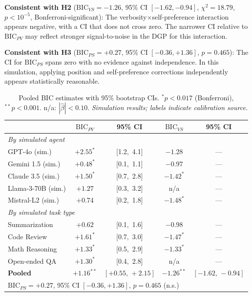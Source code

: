 \documentclass[10pt,conference]{IEEEtran}
\newcommand{\BIC}{\mathrm{BIC}}
\begin{document}
\textbf{Consistent with H2}
($\BIC_{VS}{=}{-}1.26$, 95\% CI $[-1.62,-0.94]$,
$\chi^2{=}18.79$, $p{<}10^{-5}$, Bonferroni-significant):
The verbosity$\times$self-preference interaction appears
negative, with a CI that does not cross zero.
The narrower CI relative to $\BIC_{PV}$ may reflect
stronger signal-to-noise in the DGP for this interaction.

\textbf{Consistent with H3}
($\BIC_{PS}{=}{+}0.27$, 95\% CI $[-0.36,{+}1.36]$,
$p{=}0.465$):
The CI for $\BIC_{PS}$ spans zero with no evidence
against independence.
In this simulation, applying position and self-preference
corrections independently appears statistically reasonable.

\begin{table}[htbp]
\centering
\caption{Pooled BIC estimates with 95\% bootstrap CIs.
${}^*p{<}0.017$ (Bonferroni), ${}^{**}p{<}0.001$.
n/a: $|\hat\beta|{<}0.10$.
\textit{Simulation results; labels indicate calibration source.}}
\label{tab:bic_main}
\small
\setlength{\tabcolsep}{3pt}
\begin{tabular}{lcccc}
\toprule
 & $\BIC_{PV}$ & 95\% CI & $\BIC_{VS}$ & 95\% CI \\
\midrule
\multicolumn{5}{l}{\textit{By simulated agent}} \\
GPT-4o (sim.)      & $+2.55^*$ & [1.2,~4.1] & $-1.28$    & --- \\
Gemini 1.5 (sim.)  & $+0.48^*$ & [0.1,~1.1] & $-0.97$    & --- \\
Claude 3.5 (sim.)  & $+1.50^*$ & [0.7,~2.8] & $-1.42^*$  & --- \\
Llama-3-70B (sim.) & $+1.27$   & [0.3,~3.2] & n/a        & --- \\
Mistral-L2 (sim.)  & $+0.74$   & [0.2,~1.8] & $-1.48^*$  & --- \\
\midrule
\multicolumn{5}{l}{\textit{By simulated task type}} \\
Summarization  & $+0.62$    & [0.1,~1.6] & $-0.98$    & --- \\
Code Review    & $+1.61^*$  & [0.7,~3.0] & $-1.47^*$  & --- \\
Math Reasoning & $+1.33^*$  & [0.5,~2.9] & $-1.33^*$  & --- \\
Open-ended QA  & $+1.30^*$  & [0.4,~2.8] & n/a        & --- \\
\midrule
\textbf{Pooled} &
  $\mathbf{+1.16^{**}}$ &
  $\mathbf{[+0.55,\,+2.15]}$ &
  $\mathbf{-1.26^{**}}$ &
  $\mathbf{[-1.62,\,-0.94]}$ \\
\multicolumn{5}{l}{\small $\BIC_{PS}{=}{+}0.27$,
  95\% CI $[-0.36,{+}1.36]$, $p{=}0.465$ (n.s.)} \\
\bottomrule
\end{tabular}
\end{table}
\end{document}
